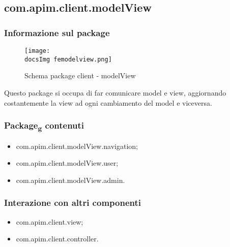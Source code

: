 {	\subsection{com.apim.client.modelView}{
		\subsubsection{Informazione sul package}{
			\begin{figure}[ht]
				\centering
				\texttt{[image: \\docsImg femodelview.png]}
				\caption{Schema package client - modelView}
			\end{figure}
			Questo package si occupa di far comunicare model e view, aggiornando costantemente la view ad ogni cambiamento del model e viceversa.
		}
		\subsubsection{Package\textsubscript{g} contenuti}{
			\begin{itemize}
				\item com.apim.client.modelView.navigation;
				\item com.apim.client.modelView.user;
				\item com.apim.client.modelView.admin.
			\end{itemize}
		}
		\subsubsection{Interazione con altri componenti}{
			\begin{itemize}
				\item com.apim.client.view;
				\item com.apim.client.controller.
			\end{itemize}
}}}
